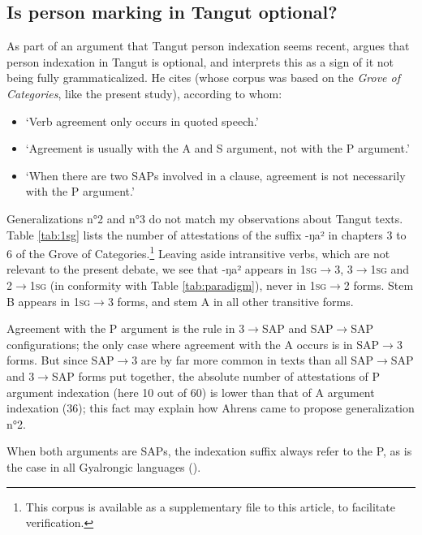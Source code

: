 \documentclass[oldfontcommands,oneside,a4paper,11pt]{article}
\newcommand{\ipa}[1]{{\phon \mbox{#1}}} %
\begin{document}
\subsection{Is person marking in Tangut optional?} \label{sec:optional}
As part of an argument that Tangut person indexation seems recent, \citet{lapolla92} argues that person indexation in Tangut is optional, and interprets this as a sign of it not being fully grammaticalized. He cites \citet{ahrens90tangut} (whose corpus was based on the \textit{Grove of Categories}, like the present study), according to whom:

\begin{itemize}
\item `Verb agreement only occurs in quoted speech.'
\item `Agreement is usually with the A and S argument, not with the P argument.'
\item `When there are two SAPs involved in a clause, agreement is not necessarily with the P argument.'
\end{itemize}

Generalizations n°2 and n°3 do not match my observations about Tangut texts. Table \ref{tab:1sg} lists the number of attestations of the suffix  \ipa{-ŋa²} in chapters 3 to 6 of the Grove of Categories.\footnote{This corpus is available as a supplementary file to this article, to facilitate verification.} Leaving aside intransitive verbs, which are not relevant to the present debate, we see that \ipa{-ŋa²} appears in \textsc{1sg}$\rightarrow$3, 3$\rightarrow$\textsc{1sg} and 2$\rightarrow$\textsc{1sg} (in conformity with Table \ref{tab:paradigm}), never in \textsc{1sg}$\rightarrow$2 forms. Stem B appears in \textsc{1sg}$\rightarrow$3 forms, and stem A in all other transitive forms. 

Agreement with the P argument is the rule in 3$\rightarrow$SAP and SAP$\rightarrow$SAP configurations; the only case where agreement with the A occurs is in SAP$\rightarrow$3 forms. But since SAP$\rightarrow$3 are by far more common in texts than all SAP$\rightarrow$SAP and 3$\rightarrow$SAP forms put together, the absolute number of attestations of P argument indexation (here 10 out of 60) is lower than that of A argument indexation (36); this fact may explain how Ahrens came to propose generalization n°2.

When both arguments are SAPs, the indexation suffix always refer to the P, as is the case in all Gyalrongic languages (\citealt{jackson03caodeng, jacques10inverse, gongxun14agreement, lai15person}). 
\end{document}
